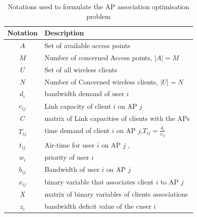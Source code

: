 \documentclass[journal,transmag]{IEEEtran}
\begin{document}
\begin{center} 
\begin{table}[htbp]
\centering
\begin{tabular}{|c|l|} %
\hline
Notation 		& Description \\
\hline
$A$				& Set of available access points\\
$M$				& Number of concerned Access points, $|A|=M$ \\
$U$				& Set of all wireless clients \\
$N$				& Number of Concerned wireless clients, $|U|=N$  \\
$d_i$			& bandwidth demand of user $i$ \\	
$c_{ij}$ 		& Link capacity of client $i$ on AP $j$ \\
$C$		 		& matrix of Link capacities of clients with the APs\\
$T_{ij}$ 		& time demand of client $i$ on AP $j$,$T_{ij}=\frac{d_i}{c_{ij}}$ \\
$t_{ij}$		& Air-time for user $i$ on AP $j$  , \\
$w_i$			& priority of user $i$ \\
$b_{ij}$		& Bandwidth of user $i$ on AP $j$ \\			
$x_{ij}$		& binary variable that associates client $i$ to AP $j$ \\
$X$				& matrix of binary variables of clients associations\\
$z_i$			& bandwidth deficit value of the cuser $i$ \\ 

\hline
\end{tabular}
\caption{\label{problem_notations} Notations used to formulate the AP association optimisation problem}
\end{table}
\end{center}
\end{document}

